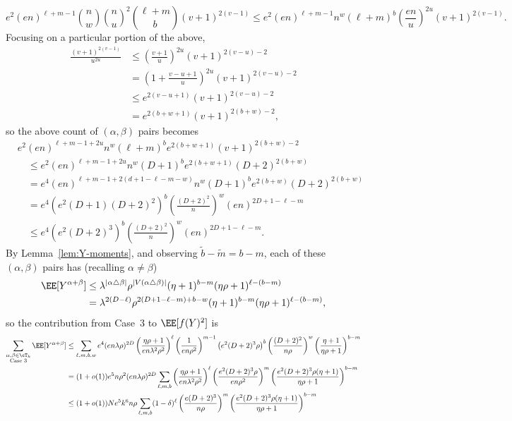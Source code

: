 \documentclass[11pt]{article}
\begin{document}
\[ e^2 (en)^{\ell+m-1} \binom{n}{w} \binom{n}{u}^2 \binom{\ell+m}{b} (v+1)^{2(v-1)} \le e^2 (en)^{\ell+m-1} n^w (\ell+m)^b \left(\frac{en}{u}\right)^{2u} (v+1)^{2(v-1)}. \]
Focusing on a particular portion of the above,
\begin{align*}
\frac{(v+1)^{2(v-1)}}{u^{2u}} &\le \left(\frac{v+1}{u}\right)^{2u} (v+1)^{2(v-u)-2} \\
&= \left(1 + \frac{v-u+1}{u}\right)^{2u} (v+1)^{2(v-u)-2} \\
&\le e^{2(v-u+1)} (v+1)^{2(v-u)-2} \\
&= e^{2(b+w+1)} (v+1)^{2(b+w)-2},
\end{align*}
so the above count of $(\alpha,\beta)$ pairs becomes
\begin{align*}
&e^2 (en)^{\ell+m-1+2u} n^w (\ell+m)^b e^{2(b+w+1)} (v+1)^{2(b+w)-2} \\
&\quad \le e^2 (en)^{\ell+m-1+2u} n^w (D+1)^b e^{2(b+w+1)} (D+2)^{2(b+w)} \\
&\quad = e^4 (en)^{\ell+m-1+2(d+1-\ell-m-w)} n^w (D+1)^b e^{2(b+w)} (D+2)^{2(b+w)} \\
&\quad = e^4 \left(e^2(D+1)(D+2)^2\right)^b \left(\frac{(D+2)^2}{n}\right)^w (en)^{2D+1-\ell-m} \\
&\quad \le e^4 \left(e^2(D+2)^3\right)^b \left(\frac{(D+2)^2}{n}\right)^w (en)^{2D+1-\ell-m}.
\end{align*}
By Lemma~\ref{lem:Y-moments}, and observing $\tilde{b}-\tilde{m} = b-m$, each of these $(\alpha,\beta)$ pairs has (recalling $\alpha \ne \beta$)
\begin{align*}
\EE[Y^{\alpha+\beta}] &\le \lambda^{|\alpha \triangle \beta|} \rho^{|V(\alpha \triangle \beta)|} (\eta+1)^{b-m} (\eta\rho+1)^{\ell-(b-m)} \\
&= \lambda^{2(D-\ell)} \rho^{2(D+1-\ell-m)+b-w} (\eta+1)^{b-m} (\eta\rho+1)^{\ell-(b-m)},
\end{align*}
so the contribution from Case~3 to $\EE[f(Y)^2]$ is
\begin{align*}
\sum_{\substack{\alpha,\beta \in \cT_k \\ \textnormal{Case 3}}} \EE[Y^{\alpha+\beta}] &\le \sum_{\ell,m,b,w} e^4 (en\lambda\rho)^{2D} \left(\frac{\eta\rho+1}{en\lambda^2\rho^2}\right)^\ell \left(\frac{1}{en \rho^2}\right)^{m-1} \left(e^2(D+2)^3 \rho\right)^b \left(\frac{(D+2)^2}{n \rho}\right)^w \left(\frac{\eta+1}{\eta\rho+1}\right)^{b-m} \\
&= (1+o(1)) e^5 n\rho^2 (en\lambda\rho)^{2D} \sum_{\ell,m,b} \left(\frac{\eta\rho+1}{en\lambda^2\rho^2}\right)^\ell \left(\frac{e^2(D+2)^3 \rho}{en\rho^2}\right)^m \left(\frac{e^2(D+2)^3 \rho(\eta+1)}{\eta\rho+1}\right)^{b-m} \\
&\le (1+o(1)) N e^5 k^6 n \rho \sum_{\ell,m,b} (1-\delta)^\ell \left(\frac{e(D+2)^3}{n\rho}\right)^m \left(\frac{e^2(D+2)^3 \rho(\eta+1)}{\eta\rho+1}\right)^{b-m}
\end{align*}
\end{document}
